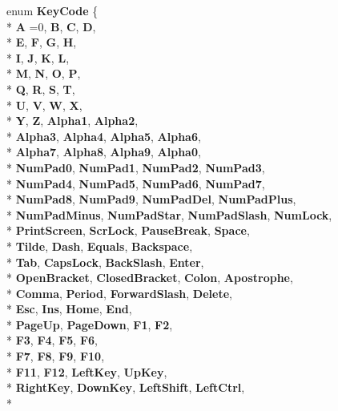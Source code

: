 \begin{DoxyCompactItemize}
\item 
enum {\bf Key\+Code} \{ \\*
{\bf A} =0, 
{\bf B}, 
{\bf C}, 
{\bf D}, 
\\*
{\bf E}, 
{\bf F}, 
{\bf G}, 
{\bf H}, 
\\*
{\bf I}, 
{\bf J}, 
{\bf K}, 
{\bf L}, 
\\*
{\bf M}, 
{\bf N}, 
{\bf O}, 
{\bf P}, 
\\*
{\bf Q}, 
{\bf R}, 
{\bf S}, 
{\bf T}, 
\\*
{\bf U}, 
{\bf V}, 
{\bf W}, 
{\bf X}, 
\\*
{\bf Y}, 
{\bf Z}, 
{\bf Alpha1}, 
{\bf Alpha2}, 
\\*
{\bf Alpha3}, 
{\bf Alpha4}, 
{\bf Alpha5}, 
{\bf Alpha6}, 
\\*
{\bf Alpha7}, 
{\bf Alpha8}, 
{\bf Alpha9}, 
{\bf Alpha0}, 
\\*
{\bf Num\+Pad0}, 
{\bf Num\+Pad1}, 
{\bf Num\+Pad2}, 
{\bf Num\+Pad3}, 
\\*
{\bf Num\+Pad4}, 
{\bf Num\+Pad5}, 
{\bf Num\+Pad6}, 
{\bf Num\+Pad7}, 
\\*
{\bf Num\+Pad8}, 
{\bf Num\+Pad9}, 
{\bf Num\+Pad\+Del}, 
{\bf Num\+Pad\+Plus}, 
\\*
{\bf Num\+Pad\+Minus}, 
{\bf Num\+Pad\+Star}, 
{\bf Num\+Pad\+Slash}, 
{\bf Num\+Lock}, 
\\*
{\bf Print\+Screen}, 
{\bf Scr\+Lock}, 
{\bf Pause\+Break}, 
{\bf Space}, 
\\*
{\bf Tilde}, 
{\bf Dash}, 
{\bf Equals}, 
{\bf Backspace}, 
\\*
{\bf Tab}, 
{\bf Caps\+Lock}, 
{\bf Back\+Slash}, 
{\bf Enter}, 
\\*
{\bf Open\+Bracket}, 
{\bf Closed\+Bracket}, 
{\bf Colon}, 
{\bf Apostrophe}, 
\\*
{\bf Comma}, 
{\bf Period}, 
{\bf Forward\+Slash}, 
{\bf Delete}, 
\\*
{\bf Esc}, 
{\bf Ins}, 
{\bf Home}, 
{\bf End}, 
\\*
{\bf Page\+Up}, 
{\bf Page\+Down}, 
{\bf F1}, 
{\bf F2}, 
\\*
{\bf F3}, 
{\bf F4}, 
{\bf F5}, 
{\bf F6}, 
\\*
{\bf F7}, 
{\bf F8}, 
{\bf F9}, 
{\bf F10}, 
\\*
{\bf F11}, 
{\bf F12}, 
{\bf Left\+Key}, 
{\bf Up\+Key}, 
\\*
{\bf Right\+Key}, 
{\bf Down\+Key}, 
{\bf Left\+Shift}, 
{\bf Left\+Ctrl}, 
\\*

\end{DoxyCompactItemize}
